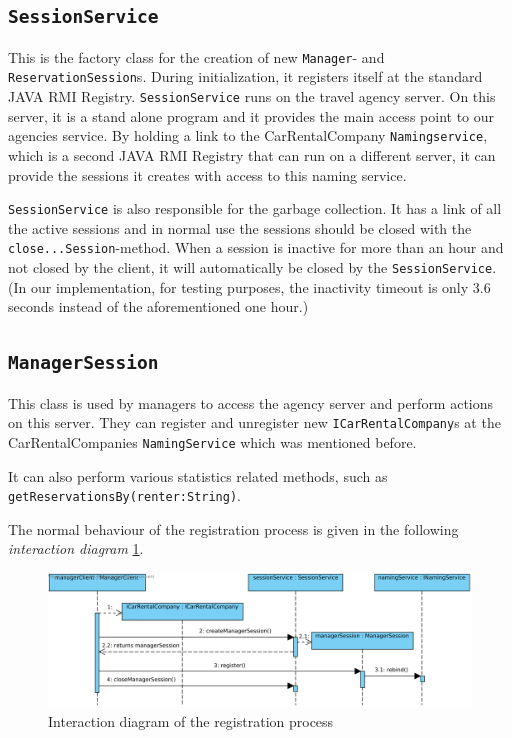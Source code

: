 \documentclass[a4paper]{article}
\begin{document}
\subsection{\texttt{SessionService}}
This is the factory class for the creation of new \texttt{Manager}- and \texttt{ReservationSession}s. During initialization, it registers itself at the standard JAVA RMI Registry. \texttt{SessionService} runs on the travel agency server. On this server, it is a stand alone program and it provides the main access point to our agencies service. By holding a link to the CarRentalCompany \texttt{Namingservice}, which is a second JAVA RMI Registry that can run on a different server, it can provide the sessions it creates with access to this naming service.

\texttt{SessionService} is also responsible for the garbage collection. It has a link of all the active sessions and in normal use the sessions should be closed with the \texttt{close...Session}-method. When a session is inactive for more than an hour and not closed by the client, it will automatically be closed by the \texttt{SessionService}.
(In our implementation, for testing purposes, the inactivity timeout is only 3.6 seconds instead of the aforementioned one hour.)

\subsection{\texttt{ManagerSession}}
This class is used by managers to access the agency server and perform actions on this server. They can register and unregister new \texttt{ICarRentalCompany}s at the CarRentalCompanies \texttt{NamingService} which was mentioned before. 

It can also perform various statistics related methods, such as \texttt{getReservationsBy(renter:String)}. 

The normal behaviour of the registration process is given in the following \emph{interaction diagram} \ref{fig:activity_carrentalregistration}.
\begin{figure}[hbtp]
\centering
\includegraphics[width=\textwidth]{img/CarRentalCompany registration process.png}
\caption{Interaction diagram of the registration process}
\label{fig:activity_carrentalregistration}
\end{figure}
\end{document}
